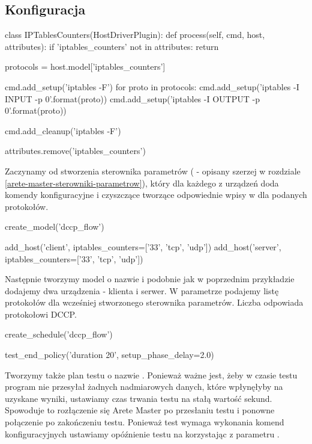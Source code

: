 \documentclass[00-praca-magisterska.tex]{subfiles}
\begin{document}
\subsection{Konfiguracja}

\begin{pythoncode}
  class IPTablesCounters(HostDriverPlugin):
      def process(self, cmd, host, attributes):
          if 'iptables_counters' not in attributes:
              return 

          protocols = host.model['iptables_counters']

          cmd.add_setup('iptables -F')
          for proto in protocols:
              cmd.add_setup('iptables -I INPUT -p {0}'.format(proto))
              cmd.add_setup('iptables -I OUTPUT -p {0}'.format(proto))

          cmd.add_cleanup('iptables -F')

          attributes.remove('iptables_counters')
\end{pythoncode}

Zaczynamy od stworzenia sterownika parametrów ( - opisany
szerzej w rozdziale \ref{arete-master-sterowniki-parametrow}), który dla każdego z urządzeń doda
komendy konfiguracyjne i czyszczące tworzące odpowiednie wpisy w 
dla podanych protokołów.

\begin{pythoncode}
  create_model('dccp_flow')

  add_host('client', iptables_counters=['33', 'tcp', 'udp'])
  add_host('server', iptables_counters=['33', 'tcp', 'udp'])
\end{pythoncode}

Następnie tworzymy model o nazwie  i podobnie jak w poprzednim
przykładzie dodajemy dwa urządzenia - klienta i serwer. W parametrze
 podajemy listę protokołów dla wcześniej stworzonego
sterownika parametrów. Liczba  odpowiada protokołowi DCCP.

\begin{pythoncode}
  create_schedule('dccp_flow')

  test_end_policy('duration 20', setup_phase_delay=2.0)
\end{pythoncode}

Tworzymy także plan testu o nazwie . Ponieważ ważne jest, żeby
w czasie testu program nie przesyłał żadnych nadmiarowych danych, które
wpłynęłyby na uzyskane wyniki, ustawiamy czas trwania testu na stałą wartość
 sekund. Spowoduje to rozłączenie się Arete Master po przesłaniu testu
i ponowne połączenie po zakończeniu testu. Ponieważ test wymaga wykonania komend
konfiguracyjnych ustawiamy opóźnienie testu na  korzystając z
parametru .
\end{document}
